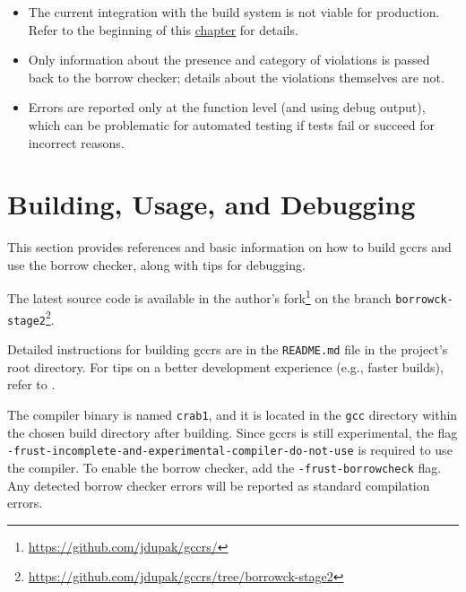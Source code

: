 \documentclass[
  11pt,
  twoside,symmetric]{report}
\newenvironment{Shaded}{}{}
\newcommand{\NormalTok}[1]{#1}
\providecommand{\tightlist}{%
  \setlength{\itemsep}{0pt}\setlength{\parskip}{0pt}}
\DeclareRobustCommand{\href}[2]{#2\footnote{\url{#1}}}
\begin{document}
\begin{itemize}
\tightlist
\item
  The current integration with the build system is not viable for
  production. Refer to the beginning of this
  \hyperref[implementation]{chapter} for details.
\item
  Only information about the presence and category of violations is
  passed back to the borrow checker; details about the violations
  themselves are not.
\item
  Errors are reported only at the function level (and using debug
  output), which can be problematic for automated testing if tests fail
  or succeed for incorrect reasons.
\end{itemize}

\section{Building, Usage, and
Debugging}\label{sec:building-usage-and-debugging}

This section provides references and basic information on how to build
gccrs and use the borrow checker, along with tips for debugging.

The latest source code is available in the author's
\href{https://github.com/jdupak/gccrs/}{fork} on the branch
\href{https://github.com/jdupak/gccrs/tree/borrowck-stage2}{\texttt{borrowck-stage2}}.

Detailed instructions for building gccrs are in the \texttt{README.md}
file in the project's root directory. For tips on a better development
experience (e.g., faster builds), refer to .

The compiler binary is named \texttt{crab1}, and it is located in the
\texttt{gcc} directory within the chosen build directory after building.
Since gccrs is still experimental, the flag
\texttt{-frust-incomplete-and-experimental-compiler-do-not-use} is
required to use the compiler. To enable the borrow checker, add the
\texttt{-frust-borrowcheck} flag. Any detected borrow checker errors
will be reported as standard compilation errors.

\begin{quote}
\begin{Shaded}
\end{Shaded}
\end{quote}
\end{document}
